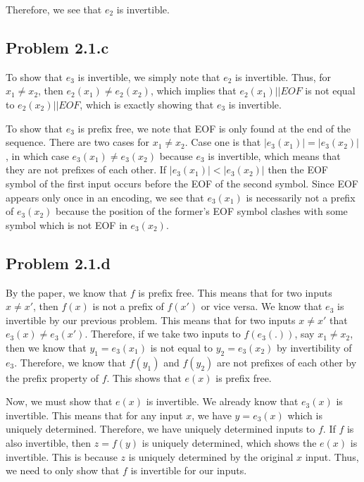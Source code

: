 \documentclass[psamsfonts]{amsart}
\begin{document}
Therefore, we see that $e_2$ is invertible.

\subsection{Problem 2.1.c}

To show that $e_3$ is invertible, we simply note that $e_2$ is invertible. Thus, for $x_1 \neq x_2$, then $e_2(x_1) \neq e_2(x_2)$, which implies that $e_2(x_1) || EOF$ is not equal to $e_2(x_2) || EOF$, which is exactly showing that $e_3$ is invertible.

To show that $e_3$ is prefix free, we note that EOF is only found at the end of the sequence. There are two cases for $x_1 \neq x_2$. Case one is that $|e_3(x_1)| = |e_3(x_2)|$, in which case $e_3(x_1) \neq e_3(x_2)$ because $e_3$ is invertible, which means that they are not prefixes of each other. If $|e_3(x_1)| < |e_3(x_2)|$ then the EOF symbol of the first input occurs before the EOF of the second symbol. Since EOF appears only once in an encoding, we see that $e_3(x_1)$ is necessarily not a prefix of $e_3(x_2)$ because the position of the former's EOF symbol clashes with some symbol which is not EOF in $e_3(x_2)$.

\subsection{Problem 2.1.d}

By the paper, we know that $f$ is prefix free. This means that for two inputs $x \neq x'$, then $f(x)$ is not a prefix of $f(x')$ or vice versa. We know that $e_3$ is invertible by our previous problem. This means that for two inputs $x \neq x'$ that $e_3(x) \neq e_3(x')$. Therefore, if we take two inputs to $f(e_3(.))$, say $x_1 \neq x_2$, then we know that $y_1 = e_3(x_1)$ is not equal to $y_2 = e_3(x_2)$ by invertibility of $e_3$. Therefore, we know that $f(y_1)$ and $f(y_2)$ are not prefixes of each other by the prefix property of $f$. This shows that $e(x)$ is prefix free.

Now, we must show that $e(x)$ is invertible. We already know that $e_3(x)$ is invertible. This means that for any input $x$, we have $y = e_3(x)$ which is uniquely determined. Therefore, we have uniquely determined inputs to $f$. If $f$ is also invertible, then $z = f(y)$ is uniquely determined, which shows the $e(x)$ is invertible. This is because $z$ is uniquely determined by the original $x$ input. Thus, we need to only show that $f$ is invertible for our inputs.
\end{document}
